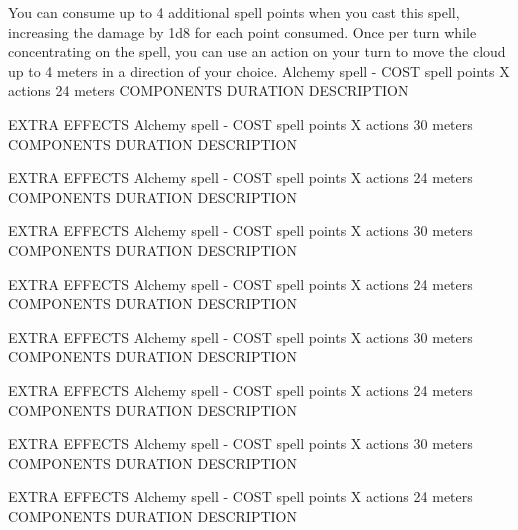         You can consume up to 4 additional spell points when you cast this spell, increasing the damage by 1d8 for each point consumed.
        Once per turn while concentrating on the spell, you can use an action on your turn to move the cloud up to 4 meters in a direction of your choice.
        {Alchemy spell - COST spell points}
        {X actions}
        {24 meters}
        {COMPONENTS}
        {DURATION}
        DESCRIPTION

        EXTRA EFFECTS
        {Alchemy spell - COST spell points}
        {X actions}
        {30 meters}
        {COMPONENTS}
        {DURATION}
        DESCRIPTION

        EXTRA EFFECTS
        {Alchemy spell - COST spell points}
        {X actions}
        {24 meters}
        {COMPONENTS}
        {DURATION}
        DESCRIPTION

        EXTRA EFFECTS
        {Alchemy spell - COST spell points}
        {X actions}
        {30 meters}
        {COMPONENTS}
        {DURATION}
        DESCRIPTION

        EXTRA EFFECTS
        {Alchemy spell - COST spell points}
        {X actions}
        {24 meters}
        {COMPONENTS}
        {DURATION}
        DESCRIPTION

        EXTRA EFFECTS
        {Alchemy spell - COST spell points}
        {X actions}
        {30 meters}
        {COMPONENTS}
        {DURATION}
        DESCRIPTION

        EXTRA EFFECTS
        {Alchemy spell - COST spell points}
        {X actions}
        {24 meters}
        {COMPONENTS}
        {DURATION}
        DESCRIPTION

        EXTRA EFFECTS
        {Alchemy spell - COST spell points}
        {X actions}
        {30 meters}
        {COMPONENTS}
        {DURATION}
        DESCRIPTION

        EXTRA EFFECTS
        {Alchemy spell - COST spell points}
        {X actions}
        {24 meters}
        {COMPONENTS}
        {DURATION}
        DESCRIPTION

